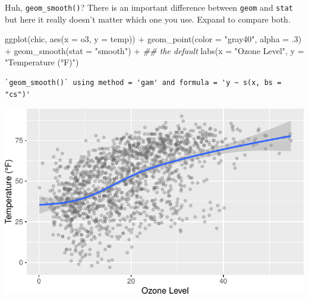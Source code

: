 \documentclass[
  letterpaper,
]{scrbook}
\newenvironment{Shaded}{\begin{snugshade}}{\end{snugshade}}
\newcommand{\AttributeTok}[1]{\textcolor[rgb]{0.40,0.45,0.13}{#1}}
\newcommand{\DecValTok}[1]{\textcolor[rgb]{0.68,0.00,0.00}{#1}}
\newcommand{\DocumentationTok}[1]{\textcolor[rgb]{0.37,0.37,0.37}{\textit{#1}}}
\newcommand{\FunctionTok}[1]{\textcolor[rgb]{0.28,0.35,0.67}{#1}}
\newcommand{\NormalTok}[1]{\textcolor[rgb]{0.00,0.23,0.31}{#1}}
\newcommand{\SpecialCharTok}[1]{\textcolor[rgb]{0.37,0.37,0.37}{#1}}
\newcommand{\StringTok}[1]{\textcolor[rgb]{0.13,0.47,0.30}{#1}}
\begin{document}
\begin{tcolorbox}[enhanced jigsaw, rightrule=.15mm, arc=.35mm, title=\textcolor{quarto-callout-tip-color}{\faLightbulb}\hspace{0.5em}{Difference between \texttt{geom} and \texttt{stat}}, colback=white, toptitle=1mm, colbacktitle=quarto-callout-tip-color!10!white, breakable, left=2mm, opacityback=0, leftrule=.75mm, bottomrule=.15mm, bottomtitle=1mm, colframe=quarto-callout-tip-color-frame, coltitle=black, toprule=.15mm, opacitybacktitle=0.6, titlerule=0mm]

Huh, \texttt{geom\_smooth()}? There is an important difference between
\texttt{geom} and \texttt{stat} but here it really doesn't matter which
one you use. Expand to compare both.

\begin{Shaded}
\begin{Highlighting}[]
\FunctionTok{ggplot}\NormalTok{(chic, }\FunctionTok{aes}\NormalTok{(}\AttributeTok{x =}\NormalTok{ o3, }\AttributeTok{y =}\NormalTok{ temp)) }\SpecialCharTok{+}
  \FunctionTok{geom\_point}\NormalTok{(}\AttributeTok{color =} \StringTok{"gray40"}\NormalTok{, }\AttributeTok{alpha =}\NormalTok{ .}\DecValTok{3}\NormalTok{) }\SpecialCharTok{+}
  \FunctionTok{geom\_smooth}\NormalTok{(}\AttributeTok{stat =} \StringTok{"smooth"}\NormalTok{) }\SpecialCharTok{+} \DocumentationTok{\#\# the default}
  \FunctionTok{labs}\NormalTok{(}\AttributeTok{x =} \StringTok{"Ozone Level"}\NormalTok{, }\AttributeTok{y =} \StringTok{"Temperature (°F)"}\NormalTok{)}
\end{Highlighting}
\end{Shaded}

\begin{verbatim}
`geom_smooth()` using method = 'gam' and formula = 'y ~ s(x, bs = "cs")'
\end{verbatim}

\includegraphics{ch17_files/figure-pdf/geom-stat-smooth-a-1.pdf}


\end{tcolorbox}
\end{document}
